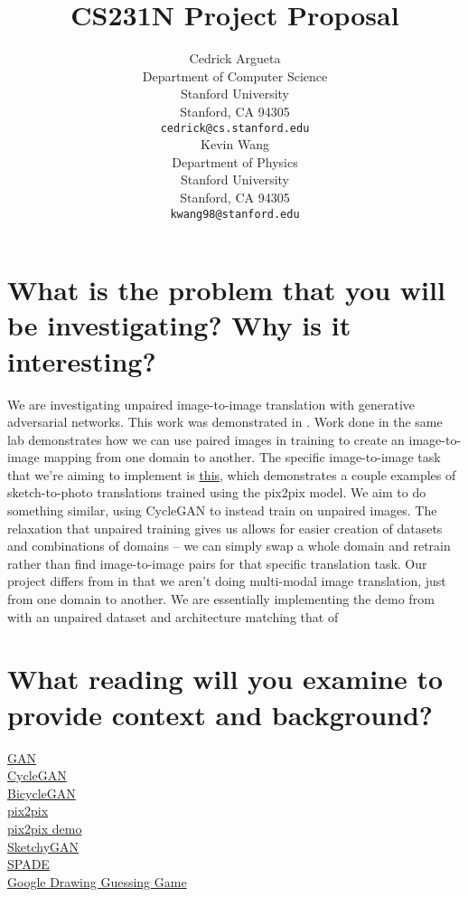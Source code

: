 \documentclass{article}
\title{CS231N Project Proposal}
\author{
  Cedrick Argueta \\
  Department of Computer Science\\
  Stanford University\\
  Stanford, CA 94305 \\
  \texttt{cedrick@cs.stanford.edu} \\
  \And
  Kevin Wang \\
  Department of Physics\\
  Stanford University\\
  Stanford, CA 94305 \\
  \texttt{kwang98@stanford.edu} \\
}
\begin{document}

\maketitle

\begin{abstract}

 
\end{abstract}


\section{What is the problem that you will be investigating? Why is it interesting?}

We are investigating unpaired image-to-image translation with generative adversarial networks.
This work was demonstrated in \cite{cycleGAN}.
Work done in the same lab \cite{pix2pix} demonstrates how we can use paired images in training to create an image-to-image mapping from one domain to another.
The specific image-to-image task that we're aiming to implement is \href{https://affinelayer.com/pixsrv/}{this}, which demonstrates a couple examples of sketch-to-photo translations trained using the pix2pix model.
We aim to do something similar, using CycleGAN to instead train on unpaired images.
The relaxation that unpaired training gives us allows for easier creation of datasets and combinations of domains -- we can simply swap a whole domain and retrain rather than find image-to-image pairs for that specific translation task.
Our project differs from \cite{bicyclegan} in that we aren't doing multi-modal image translation, just from one domain to another. 
We are essentially implementing the demo from \cite{pix2pix} with an unpaired dataset and architecture matching that of \cite{cycleGAN}

\section{What reading will you examine to provide context and background?}

\href{https://arxiv.org/abs/1406.2661}{GAN} \\
\href{https://arxiv.org/pdf/1703.10593.pdf}{CycleGAN} \\
\href{https://arxiv.org/abs/1711.11586}{BicycleGAN} \\
\href{https://arxiv.org/abs/1611.07004}{pix2pix} \\
\href{https://affinelayer.com/pixsrv/}{pix2pix demo} \\
\href{https://arxiv.org/abs/1801.02753}{SketchyGAN} \\
\href{https://arxiv.org/abs/1903.07291}{SPADE} \\
\href{https://quickdraw.withgoogle.com/}{Google Drawing Guessing Game} \\
\end{document}
